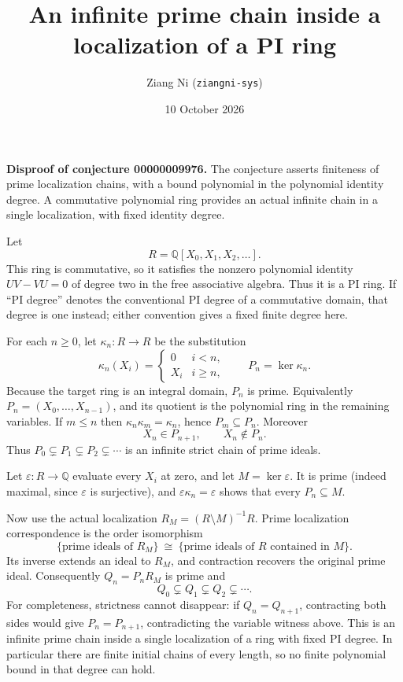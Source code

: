 \documentclass[11pt]{article}
\title{An infinite prime chain inside a localization of a PI ring}
\author{Ziang Ni (\texttt{ziangni-sys})}
\date{10 October 2026}
\begin{document}
\maketitle
\noindent\textbf{Disproof of conjecture 00000009976.}
The conjecture asserts finiteness of prime localization chains,
with a bound polynomial in the polynomial identity degree. A
commutative polynomial ring provides an actual infinite chain in a
single localization, with fixed identity degree.

Let
\[
 R=\mathbb Q[X_0,X_1,X_2,\ldots].
\]
This ring is commutative, so it satisfies the nonzero polynomial
identity $UV-VU=0$ of degree two in the free associative algebra.
Thus it is a PI ring. If ``PI degree'' denotes the conventional PI
degree of a commutative domain, that degree is one instead; either
convention gives a fixed finite degree here.

For each $n\geq0$, let $\kappa_n:R\to R$ be the substitution
\[
 \kappa_n(X_i)=\begin{cases}0&i<n,\\X_i&i\geq n,\end{cases}
 \qquad P_n=\ker\kappa_n.
\]
Because the target ring is an integral domain, $P_n$ is prime.
Equivalently $P_n=(X_0,\ldots,X_{n-1})$, and its quotient is the
polynomial ring in the remaining variables. If $m\leq n$ then
$\kappa_n\kappa_m=\kappa_n$, hence $P_m\subseteq P_n$.
Moreover
\[
 X_n\in P_{n+1},\qquad X_n\notin P_n.
\]
Thus $P_0\subsetneq P_1\subsetneq P_2\subsetneq\cdots$ is an
infinite strict chain of prime ideals.

Let $\varepsilon:R\to\mathbb Q$ evaluate every $X_i$ at zero, and
let $M=\ker\varepsilon$. It is prime (indeed maximal, since
$\varepsilon$ is surjective), and $\varepsilon\kappa_n=\varepsilon$
shows that every $P_n\subseteq M$.

Now use the actual localization $R_M=(R\setminus M)^{-1}R$.
Prime localization correspondence is the order isomorphism
\[
 \{\text{prime ideals of }R_M\}\ \cong\
 \{\text{prime ideals of }R\text{ contained in }M\}.
\]
Its inverse extends an ideal to $R_M$, and contraction recovers the
original prime ideal. Consequently $Q_n=P_nR_M$ is prime and
\[
 Q_0\subsetneq Q_1\subsetneq Q_2\subsetneq\cdots.
\]
For completeness, strictness cannot disappear: if $Q_n=Q_{n+1}$,
contracting both sides would give $P_n=P_{n+1}$, contradicting the
variable witness above. This is an infinite prime chain inside a
single localization of a ring with fixed PI degree. In particular
there are finite initial chains of every length, so no finite
polynomial bound in that degree can hold.
\end{document}
